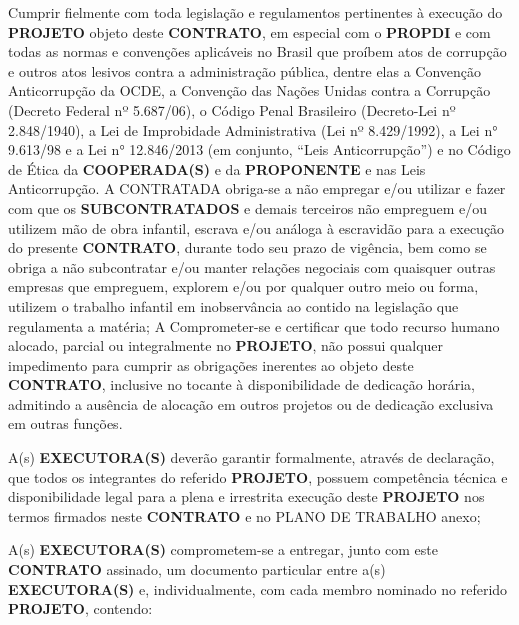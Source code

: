 \xx Cumprir fielmente com toda legislação e regulamentos pertinentes à execução do \textbf{PROJETO} objeto deste \textbf{CONTRATO}, em especial com o \textbf{PROPDI} e com todas as normas e convenções aplicáveis no Brasil que proíbem atos de corrupção e outros atos lesivos contra a administração pública, dentre elas a Convenção Anticorrupção da OCDE, a Convenção das Nações Unidas contra a Corrupção (Decreto Federal nº 5.687/06), o Código Penal Brasileiro (Decreto-Lei nº 2.848/1940), a Lei de Improbidade Administrativa (Lei nº 8.429/1992), a Lei n° 9.613/98 e a Lei n° 12.846/2013 (em conjunto, “Leis Anticorrupção”) e no Código de Ética da \textbf{COOPERADA(S)} e da \textbf{PROPONENTE} e nas Leis Anticorrupção.
A CONTRATADA obriga-se a não empregar e/ou utilizar e fazer com que os \textbf{SUBCONTRATADOS} e demais terceiros não empreguem e/ou utilizem mão de obra infantil, escrava e/ou análoga à escravidão para a execução do presente \textbf{CONTRATO}, durante todo seu prazo de vigência, bem como se obriga a não subcontratar e/ou manter relações negociais com quaisquer outras empresas que empreguem, explorem e/ou por qualquer outro meio ou forma, utilizem o trabalho infantil em inobservância ao contido na legislação que regulamenta a matéria;
A
\xx Comprometer-se e certificar que todo recurso humano alocado, parcial ou integralmente no \textbf{PROJETO}, não possui qualquer impedimento para cumprir as obrigações inerentes ao objeto deste \textbf{CONTRATO}, inclusive no tocante à disponibilidade de dedicação horária, admitindo a ausência de alocação em outros projetos ou de dedicação exclusiva em outras funções.

\xxx  A(s) \textbf{EXECUTORA(S)} deverão garantir formalmente, através de declaração, que todos os integrantes do referido \textbf{PROJETO}, possuem competência técnica e disponibilidade legal para a plena e irrestrita execução deste \textbf{PROJETO} nos termos firmados neste \textbf{CONTRATO} e no PLANO DE TRABALHO anexo;

\xxx  A(s) \textbf{EXECUTORA(S)} comprometem-se a entregar, junto com este \textbf{CONTRATO} assinado, um documento particular entre a(s) \textbf{EXECUTORA(S)} e, individualmente, com cada membro nominado no referido \textbf{PROJETO}, contendo:

